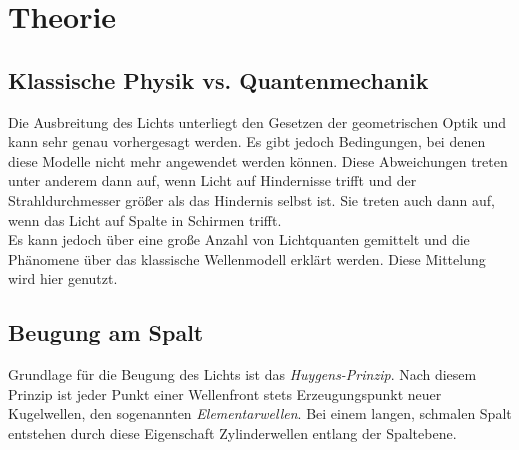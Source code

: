 \section{Theorie}
\label{sec:Theorie}

\subsection{Klassische Physik vs. Quantenmechanik}
Die Ausbreitung des Lichts unterliegt den Gesetzen der geometrischen Optik und kann sehr genau vorhergesagt werden.
Es gibt jedoch Bedingungen, bei denen diese Modelle nicht mehr angewendet werden können.
Diese Abweichungen treten unter anderem dann auf, wenn Licht auf Hindernisse trifft und der Strahldurchmesser größer als das Hindernis selbst ist.
Sie treten auch dann auf, wenn das Licht auf Spalte in Schirmen trifft.\\
Es kann jedoch über eine große Anzahl von Lichtquanten gemittelt und die Phänomene über das klassische Wellenmodell erklärt werden.
Diese Mittelung wird hier genutzt.\\

\subsection{Beugung am Spalt}
Grundlage für die Beugung des Lichts ist das \textit{Huygens-Prinzip}.
Nach diesem Prinzip ist jeder Punkt einer Wellenfront stets Erzeugungspunkt neuer Kugelwellen, den sogenannten \textit{Elementarwellen}.
Bei einem langen, schmalen Spalt entstehen durch diese Eigenschaft Zylinderwellen entlang der Spaltebene.


